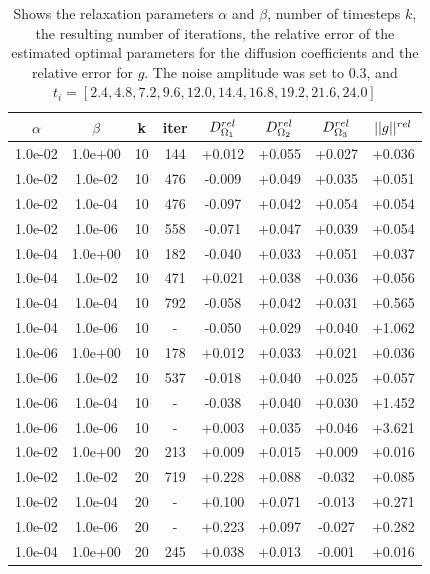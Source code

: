 \documentclass[11pt,a4paper]{article}
\begin{document}
\begin{table}[t]
\centering
\caption{Shows the relaxation parameters $\alpha$ and $\beta$, number of timesteps $k$, the resulting number of iterations, the relative error of the estimated optimal parameters for the diffusion coefficients and the relative error for $g$. The noise amplitude was set to 0.3, and $t_i =[2.4, 4.8, 7.2, 9.6, 12.0, 14.4, 16.8, 19.2, 21.6, 24.0]$  }
\begin{tabular}{*{8}c}
$\alpha$ & $\beta$ & k  & iter & $ D_{\Omega_1}\sp{rel}$ & $D_{\Omega_2}\sp{rel} $ & $D_{\Omega_3}\sp{rel} $ & $|| g ||\sp{rel} $ \\
\hline
 1.0e-02 	 & 1.0e+00 	 & 10 & 144 	 & +0.012 & +0.055 & +0.027 & +0.036 \\ 
 1.0e-02 	 & 1.0e-02 	 & 10 & 476 	 & -0.009 & +0.049 & +0.035 & +0.051 \\ 
 1.0e-02 	 & 1.0e-04 	 & 10 & 476 	 & -0.097 & +0.042 & +0.054 & +0.054 \\ 
 1.0e-02 	 & 1.0e-06 	 & 10 & 558 	 & -0.071 & +0.047 & +0.039 & +0.054 \\ 
 1.0e-04 	 & 1.0e+00 	 & 10 & 182 	 & -0.040 & +0.033 & +0.051 & +0.037 \\ 
 1.0e-04 	 & 1.0e-02 	 & 10 & 471 	 & +0.021 & +0.038 & +0.036 & +0.056 \\ 
 1.0e-04 	 & 1.0e-04 	 & 10 & 792 	 & -0.058 & +0.042 & +0.031 & +0.565 \\ 
 1.0e-04 	 & 1.0e-06 	 & 10 &  -   & -0.050 & +0.029 & +0.040 & +1.062 \\ 
 1.0e-06 	 & 1.0e+00 	 & 10 & 178 	 & +0.012 & +0.033 & +0.021 & +0.036 \\ 
 1.0e-06 	 & 1.0e-02 	 & 10 & 537 	 & -0.018 & +0.040 & +0.025 & +0.057 \\ 
 1.0e-06 	 & 1.0e-04 	 & 10 &  -	 & -0.038 & +0.040 & +0.030 & +1.452 \\ 
 1.0e-06 	 & 1.0e-06 	 & 10 &  - 	 & +0.003 & +0.035 & +0.046 & +3.621 \\ 
 1.0e-02 	 & 1.0e+00 	 & 20 & 213 	 & +0.009 & +0.015 & +0.009 & +0.016 \\ 
 1.0e-02 	 & 1.0e-02 	 & 20 & 719 	 & +0.228 & +0.088 & -0.032 & +0.085 \\ 
 1.0e-02 	 & 1.0e-04 	 & 20 &  -   & +0.100 & +0.071 & -0.013 & +0.271 \\ 
 1.0e-02 	 & 1.0e-06 	 & 20 &   -  & +0.223 & +0.097 & -0.027 & +0.282 \\ 
 1.0e-04 	 & 1.0e+00 	 & 20 & 245 	 & +0.038 & +0.013 & -0.001 & +0.016 \\ 

\end{tabular}
\end{table}
\end{document}
